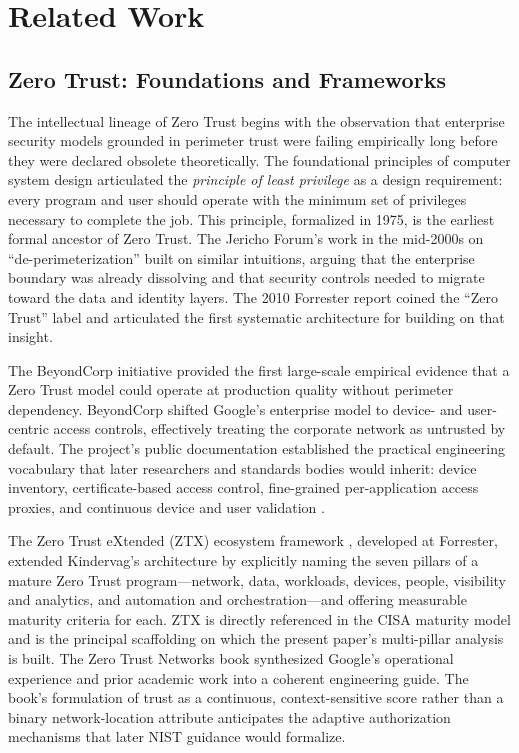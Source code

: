 \documentclass[acmlarge]{acmart}
\begin{document}
\section{Related Work}
\label{sec:related}

\subsection{Zero Trust: Foundations and Frameworks}

The intellectual lineage of Zero Trust begins with the observation that enterprise security
models grounded in perimeter trust were failing empirically long before they were declared
obsolete theoretically. The foundational principles of computer system design \cite{saltzer1975} articulated the \textit{principle of least privilege} as a design
requirement: every program and user should operate with the minimum set of privileges
necessary to complete the job. This principle, formalized in 1975, is the earliest formal
ancestor of Zero Trust. The Jericho Forum's work in the mid-2000s on ``de-perimeterization''
built on similar intuitions, arguing that the enterprise boundary was already dissolving and
that security controls needed to migrate toward the data and identity layers. The 2010 Forrester report \cite{kindervag2010} coined the ``Zero Trust'' label and articulated
the first systematic architecture for building on that insight.

The BeyondCorp initiative \cite{ward2014beyondcorp,osborn2016beyondcorp} provided the first
large-scale empirical evidence that a Zero Trust model could operate at production
quality without perimeter dependency. BeyondCorp shifted Google's enterprise model to
device- and user-centric access controls, effectively treating the corporate network as
untrusted by default. The project's public documentation established the practical
engineering vocabulary that later researchers and standards bodies would inherit: device
inventory, certificate-based access control, fine-grained per-application access proxies,
and continuous device and user validation \cite{beyer2017beyondcorp}.

The Zero Trust eXtended (ZTX) ecosystem framework \cite{cunningham2018}, developed
at Forrester, extended Kindervag's architecture by explicitly naming the seven pillars of
a mature Zero Trust program---network, data, workloads, devices, people, visibility and
analytics, and automation and orchestration---and offering measurable maturity criteria
for each. ZTX is directly referenced in the CISA maturity model \cite{cisa2023} and is
the principal scaffolding on which the present paper's multi-pillar analysis is built.
The Zero Trust Networks book \cite{gilman2017} synthesized Google's operational experience and
prior academic work into a coherent engineering guide. The book's formulation of trust
as a continuous, context-sensitive score rather than a binary network-location attribute
anticipates the adaptive authorization mechanisms that later NIST guidance would formalize.
\end{document}
